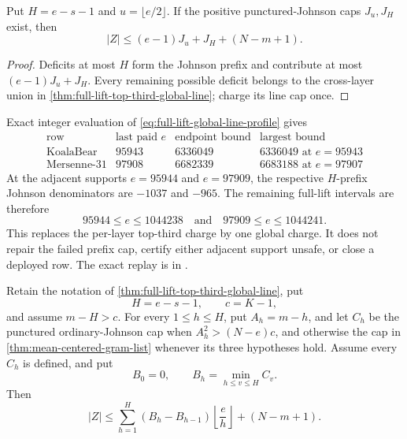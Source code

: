 \documentclass[11pt,a4paper]{amsart}
\numberwithin{equation}{section}
\theoremstyle{remark}
\begin{document}
\begin{corollary}
\label{cor:full-lift-global-line-profile}
Put $H=e-s-1$ and $u=\lfloor e/2\rfloor$.  If the positive
punctured-Johnson caps $J_u,J_H$ exist, then
\begin{equation}
 |Z|\le (e-1)J_u+J_H+(N-m+1).
 \label{eq:full-lift-global-line-profile}
\end{equation}
\end{corollary}

\begin{proof}
Deficits at most $H$ form the Johnson prefix and contribute at most
$(e-1)J_u+J_H$.  Every remaining possible deficit belongs to the
cross-layer union in
\cref{thm:full-lift-top-third-global-line}; charge its line cap once.
\end{proof}

\begin{remark}
Exact integer evaluation of
\eqref{eq:full-lift-global-line-profile} gives
\[
\begin{array}{c|r|r|r}
\text{row}&\text{last paid }e&\text{endpoint bound}&\text{largest bound}\\ \hline
\text{KoalaBear}&95943&6336049&6336049\text{ at }e=95943\\
\text{Mersenne-31}&97908&6682339&6683188\text{ at }e=97907
\end{array}
\]
At the adjacent supports $e=95944$ and $e=97909$, the respective
$H$-prefix Johnson denominators are $-1037$ and $-965$.  The
remaining full-lift intervals are therefore
\[
 95944\le e\le1044238
 \quad\text{and}\quad
 97909\le e\le1044241.
\]
This replaces the per-layer top-third charge by one global charge.  It does
not repair the failed prefix cap, certify either adjacent support unsafe,
or close a deployed row.  The exact replay is in
.
\end{remark}

\begin{corollary}
\label{cor:full-lift-mean-centered-global-line-profile}
Retain the notation of
\cref{thm:full-lift-top-third-global-line}, put
\[
 H=e-s-1,
 \qquad c=K-1,
\]
and assume $m-H>c$.  For every $1\le h\le H$, put
$A_h=m-h$, and let $C_h$ be the punctured ordinary-Johnson cap when
$A_h^2>(N-e)c$, and otherwise the cap in
\cref{thm:mean-centered-gram-list} whenever its three hypotheses hold.
Assume every $C_h$ is defined, and put
\[
 B_0=0,
 \qquad B_h=\min_{h\le v\le H}C_v.
\]
Then
\begin{equation}
 |Z|\le
 \sum_{h=1}^{H}(B_h-B_{h-1})
       \left\lfloor\frac eh\right\rfloor
 +(N-m+1).
 \label{eq:full-lift-mean-centered-global-line-profile}
\end{equation}
\end{corollary}
\end{document}
